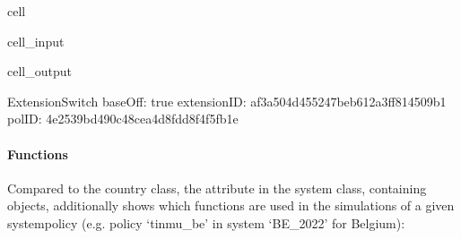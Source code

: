 \documentclass[letterpaper,10pt,english]{sphinxmanual}
\begin{document}
\begin{sphinxuseclass}{cell}
\begin{sphinxuseclass}{cell_input}
\begin{sphinxVerbatim}[commandchars=\\\{\}]
\PYG{p}{[}\PYG{p}{]}\PYG{p}{[}\PYG{p}{]}\PYG{p}{[}\PYG{p}{]}\PYG{p}{[}\PYG{p}{]}
\end{sphinxVerbatim}

\end{sphinxuseclass}
\begin{sphinxuseclass}{cell_output}
\begin{sphinxVerbatim}[commandchars=\\\{\}]
\PYGZhy{}\PYGZhy{}\PYGZhy{}\PYGZhy{}\PYGZhy{}\PYGZhy{}\PYGZhy{}\PYGZhy{}\PYGZhy{}\PYGZhy{}\PYGZhy{}\PYGZhy{}\PYGZhy{}\PYGZhy{}\PYGZhy{}\PYGZhy{}\PYGZhy{}\PYGZhy{}\PYGZhy{}\PYGZhy{}\PYGZhy{}\PYGZhy{}\PYGZhy{}\PYGZhy{}\PYGZhy{}\PYGZhy{}\PYGZhy{}\PYGZhy{}\PYGZhy{}\PYGZhy{}
ExtensionSwitch
\PYGZhy{}\PYGZhy{}\PYGZhy{}\PYGZhy{}\PYGZhy{}\PYGZhy{}\PYGZhy{}\PYGZhy{}\PYGZhy{}\PYGZhy{}\PYGZhy{}\PYGZhy{}\PYGZhy{}\PYGZhy{}\PYGZhy{}\PYGZhy{}\PYGZhy{}\PYGZhy{}\PYGZhy{}\PYGZhy{}\PYGZhy{}\PYGZhy{}\PYGZhy{}\PYGZhy{}\PYGZhy{}\PYGZhy{}\PYGZhy{}\PYGZhy{}\PYGZhy{}\PYGZhy{}
	 baseOff: \PYGZsq{}true\PYGZsq{}
	 extensionID: \PYGZsq{}af3a504d\PYGZhy{}4552\PYGZhy{}47be\PYGZhy{}b612\PYGZhy{}a3ff814509b1\PYGZsq{}
	 polID: \PYGZsq{}4e2539bd\PYGZhy{}490c\PYGZhy{}48ce\PYGZhy{}a4d8\PYGZhy{}fdd8f4f5fb1e\PYGZsq{}
\end{sphinxVerbatim}

\end{sphinxuseclass}
\end{sphinxuseclass}

\paragraph{Functions}
\label{\detokenize{userguide:id5}}
\sphinxAtStartPar
Compared to the country class, the attribute  in the system class, containing  objects, additionally shows which functions are used in the simulations of a given system\sphinxhyphen{}policy (e.g. policy ‘tinmu\_be’ in system ‘BE\_2022’ for Belgium):
\end{document}
